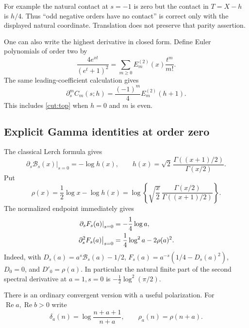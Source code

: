 \documentclass[11pt]{article}
\theoremstyle{definition}
\theoremstyle{remark}
\numberwithin{equation}{section}
\newcommand{\Rea}{\operatorname{Re}}
\begin{document}
For example the natural contact at $s=-1$ is zero but the contact in
$T=X-h$ is $h/4$. Thus ``odd negative orders have no contact'' is
correct only with the displayed natural coordinate. Translation does
not preserve that parity assertion.

One can also write the highest derivative in closed form. Define
Euler polynomials of order two by
\[
 \frac{4e^{xt}}{(e^t+1)^2}
 =\sum_{m\ge0}E_m^{(2)}(x)\frac{t^m}{m!}.
\]
The same leading-coefficient calculation gives
\begin{equation}\label{cut:translatedtop}
 \partial_s^m C_m(s;h)=\frac{(-1)^m}{4}E_m^{(2)}(h+1).
\end{equation}
This includes \eqref{cut:top} when $h=0$ and $m$ is even.

\subsection{Explicit Gamma identities at order zero}

The classical Lerch formula gives
\begin{equation}\label{cut:Lerch}
 \left.\partial_s\mathcal B_s(x)\right|_{s=0}
 =-\log h(x),\qquad
 h(x)=\sqrt2\,\frac{\Gamma((x+1)/2)}{\Gamma(x/2)}.
\end{equation}
Put
\begin{equation}\label{cut:rho}
 \rho(x)=\frac12\log x-\log h(x)
 =\log\left\{\sqrt{\frac{x}{2}}\,
          \frac{\Gamma(x/2)}{\Gamma((x+1)/2)}\right\}.
\end{equation}
The normalized endpoint immediately gives
\begin{align}
 \left.\partial_sF_s(a)\right|_{s=0}
    &=-\frac14\log a,\label{cut:Fzero}\\
 \left.\partial_s^2F_s(a)\right|_{s=0}
    &=\frac14\log^2a-2\rho(a)^2.\notag
\end{align}
Indeed, with $D_s(a)=a^s\mathcal B_s(a)-1/2$,
$F_s(a)=a^{-s}(1/4-D_s(a)^2)$, $D_0=0$, and $D'_0=\rho(a)$.
In particular the natural finite part of the second spectral derivative
at $a=1,s=0$ is $-\tfrac12\log^2(\pi/2)$.

There is an ordinary convergent version with a useful polarization.
For $\Rea a,\Rea b>0$ write
\[
 \delta_a(n)=\log\frac{n+a+1}{n+a},\qquad
 \rho_a(n)=\rho(n+a).
\]
\end{document}
